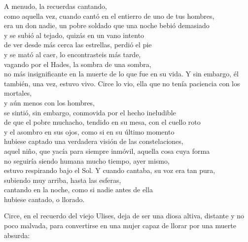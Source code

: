\begin{versopropio}
A menudo, la recuerdas cantando,\\
como aquella vez, cuando cantó en el entierro de uno de tus hombres,\\
era un don nadie, un pobre soldado que una noche bebió demasiado\\
y se subió al tejado, quizás en un vano intento\\
de ver desde más cerca las estrellas, perdió el pie\\
y se mató al caer, lo encontrasteis más tarde,\\
vagando por el Hades, la sombra de una sombra,\\
no más insignificante en la muerte de lo que fue en su vida.
\stanzabreak
Y sin embargo, él también, una vez, estuvo vivo.
\stanzabreak
Circe lo vio, ella que no tenía paciencia con los mortales,\\
y aún menos con los hombres,\\
se sintió, sin embargo, conmovida por el hecho ineludible\\
de que el pobre muchacho, tendido en su mesa, con el cuello roto\\
y el asombro en sus ojos, como si en su último momento\\
hubiese captado una verdadera visión de las constelaciones,\\
aquel niño, que yacía para siempre inmóvil, aquella cosa cuya forma\\
no seguiría siendo humana mucho tiempo, ayer mismo,\\
estuvo respirando bajo el Sol.
\stanzabreak
Y cuando cantaba, su voz era tan pura,\\
subiendo muy arriba, hasta las esferas,\\
cantando en la noche, como si nadie antes de ella\\
hubiese cantado, o llorado.
\end{versopropio}

Circe, en el recuerdo del viejo Ulises, deja de ser una diosa altiva, distante y no poco malvada, para convertirse en una mujer capaz de llorar por una muerte absurda:


